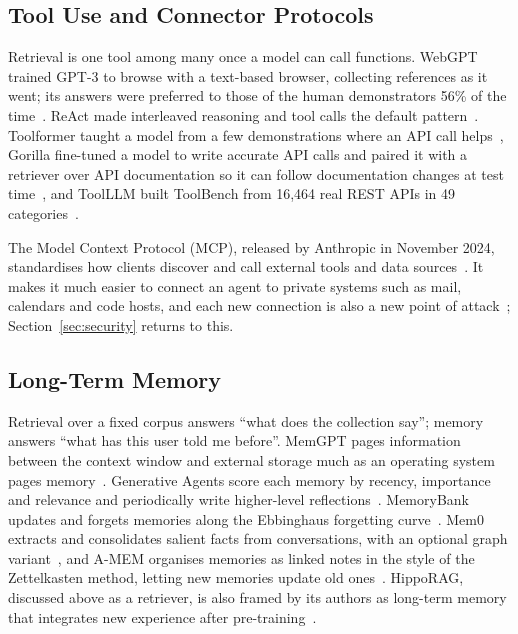 \documentclass[pdflatex,sn-mathphys-num]{sn-jnl}%
\begin{document}
\subsection{Tool Use and Connector Protocols}
Retrieval is one tool among many once a model can call functions. WebGPT trained GPT-3 to browse with a text-based browser, collecting references as it went; its answers were preferred to those of the human demonstrators 56\% of the time~\cite{nakano2021webgpt}. ReAct made interleaved reasoning and tool calls the default pattern~\cite{yao2023react}. Toolformer taught a model from a few demonstrations where an API call helps~\cite{schick2023toolformer}, Gorilla fine-tuned a model to write accurate API calls and paired it with a retriever over API documentation so it can follow documentation changes at test time~\cite{patil2024gorilla}, and ToolLLM built ToolBench from 16,464 real REST APIs in 49 categories~\cite{qin2024toolllm}.

The Model Context Protocol (MCP), released by Anthropic in November 2024, standardises how clients discover and call external tools and data sources~\cite{anthropic2024mcp}. It makes it much easier to connect an agent to private systems such as mail, calendars and code hosts, and each new connection is also a new point of attack~\cite{hou2025mcp}; Section~\ref{sec:security} returns to this.

\subsection{Long-Term Memory}
Retrieval over a fixed corpus answers ``what does the collection say''; memory answers ``what has this user told me before''. MemGPT pages information between the context window and external storage much as an operating system pages memory~\cite{packer2023memgpt}. Generative Agents score each memory by recency, importance and relevance and periodically write higher-level reflections~\cite{park2023generative}. MemoryBank updates and forgets memories along the Ebbinghaus forgetting curve~\cite{zhong2024memorybank}. Mem0 extracts and consolidates salient facts from conversations, with an optional graph variant~\cite{chhikara2025mem0}, and A-MEM organises memories as linked notes in the style of the Zettelkasten method, letting new memories update old ones~\cite{xu2025amem}. HippoRAG, discussed above as a retriever, is also framed by its authors as long-term memory that integrates new experience after pre-training~\cite{gutierrez2024hipporag}.
\end{document}
